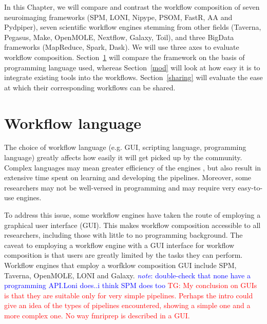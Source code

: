 \documentclass{report}
\newcommand{\note}[1]{\textcolor{blue}{\textit{note}: #1}}
\newcommand{\tristan}[1]{\textcolor{red}{TG: #1}}
\begin{document}
        In this Chapter, we will compare and contrast the workflow composition 
        of seven neuroimaging frameworks (SPM, LONI, Nipype, PSOM, FastR, AA and
        Pydpiper), seven scientific workflow engines stemming from other fields
        (Taverna, Pegasus, Make, OpenMOLE, Nextflow, Galaxy, Toil), and three
        BigData frameworks (MapReduce, Spark, Dask). We will use three axes to
        evaluate workflow composition. Section~\ref{lang} will compare the 
        framework on the basis of programming language used, whereas 
        Section~\ref{mod} will look at how easy it is to integrate existing 
        tools into the workflows. Section~\ref{sharing} will evaluate the ease
        at which their corresponding workflows can be shared.

        \section{Workflow language}\label{lang}
            The choice of workflow language (e.g. GUI, scripting language,
            programming language) greatly
            affects how easily it will get picked up by the community. Complex
            languages may mean greater efficiency of the engines
            , but also result in extensive time spent on learning and developing
            the pipelines. Moreover, some researchers may not be well-versed in
            programming and may require very easy-to-use engines.

            To address this issue, some workflow engines have taken the route
            of employing a graphical user interface (GUI). This makes workflow 
            composition accessible to all researchers, including those with
            little to no programming background. The caveat to employing a 
            workflow engine with a GUI interface for workflow composition is
            that users are greatly limited by the tasks they can perform. 
            Workflow engines that employ a worfklow composition GUI include
            SPM, Taverna, OpenMOLE, LONI and Galaxy. \note{double-check that 
            none have a programming API.Loni does..i think SPM does too}
            \tristan{My conclusion on GUIs is that they are suitable only
            for very simple pipelines. Perhaps the intro could give an idea
            of the types of pipelines encountered, showing a simple one and
            a more complex one. No way fmriprep is described in a GUI.}
\end{document}
